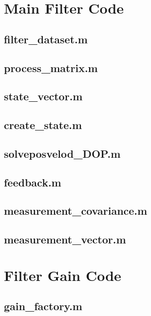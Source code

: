 \section{Main Filter Code}
\subsection{filter\_dataset.m}

\subsection{process\_matrix.m}

\subsection{state\_vector.m}

\subsection{create\_state.m}

\subsection{solveposvelod\_DOP.m}

\subsection{feedback.m}

\subsection{measurement\_covariance.m}

\subsection{measurement\_vector.m}


\section{Filter Gain Code}
\subsection{gain\_factory.m}

